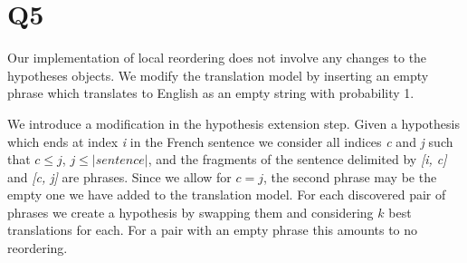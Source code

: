 \section*{Q5}

Our implementation of local reordering does not involve any changes to the
hypotheses objects. We modify the translation model by inserting an empty
phrase which translates to English as an empty string with probability 1.

We introduce a modification in the hypothesis extension step. Given a
hypothesis which ends at index \textit{i} in the French sentence we consider
all indices \textit{c} and \textit{j} such that $c \leq j$, $j \leq
|sentence|$, and the fragments of the sentence delimited by \textit{[i, c]}
and \textit{[c, j]} are phrases. Since we allow for $c = j$, the second
phrase may be the empty one we have added to the translation model. For each
discovered pair of phrases we create a hypothesis by swapping them and
considering $k$ best translations for each. For a pair with an empty phrase
this amounts to no reordering.
